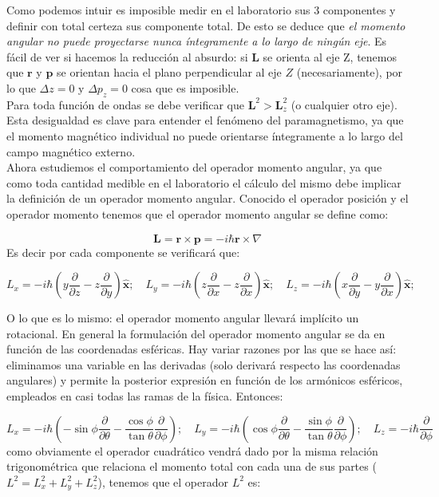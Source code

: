 \documentclass[12pt]{article}
\newcommand{\parentesis}[1]{\left( #1  \right)}
\newcommand{\parciales}[2]{\frac{\partial #1}{\partial #2}}
\newcommand{\rn}{\mathbf{r}}
\newcommand{\pn}{\mathbf{p}}
\newcommand{\Ln}{\mathbf{L}}
\newcommand{\xn}{\mathbf{\hat{x}}}
\begin{document}
Como podemos intuir es imposible medir en el laboratorio sus 3 componentes y definir con total certeza sus componente total. De esto se deduce que \textit{el momento angular no puede proyectarse nunca íntegramente a lo largo de ningún eje}. Es fácil de ver si hacemos la reducción al absurdo: si $\Ln$ se orienta al eje Z, tenemos que $\rn$ y $\pn$ se orientan hacia el plano perpendicular al eje $Z$ (necesariamente), por lo que $\Delta z = 0$ y $\Delta p_z = 0$ cosa que es imposible. \\

Para toda función de ondas se debe verificar que $\Ln^2 > \Ln_z^2$ (o cualquier otro eje). Esta desigualdad es clave para entender el fenómeno del paramagnetismo, ya que el momento magnético individual no puede orientarse íntegramente a lo largo del campo magnético externo. \\

Ahora estudiemos el comportamiento del operador momento angular, ya que como toda cantidad medible en el laboratorio el cálculo del mismo debe implicar la definición de un operador momento angular. Conocido el operador posición y el operador momento tenemos que el operador momento angular se define como:

$$\Ln = \rn \times \pn = - i \hbar \rn \times \nabla $$
Es decir por cada componente se verificará que:

\begin{equation} 
L_x = - i \hbar \parentesis{y \parciales{}{z}-z\parciales{}{y}} \xn; \quad L_y = - i \hbar \parentesis{z \parciales{}{x}-z\parciales{}{x}} \xn; \quad L_z = - i \hbar \parentesis{x \parciales{}{y}-y\parciales{}{x}} \xn; 
\end{equation}

O lo que es lo mismo: el operador momento angular llevará implícito un rotacional. En general la formulación del operador momento angular se da en función de las coordenadas esféricas. Hay variar razones por las que se hace así: eliminamos una variable en las derivadas (solo derivará respecto las coordenadas angulares) y permite la posterior expresión en función de los armónicos esféricos, empleados en casi todas las ramas de la física. Entonces:

\begin{equation}
L_x = - i \hbar \parentesis{- \sin \phi \parciales{}{\theta} - \dfrac{\cos \phi}{\tan \theta}\parciales{}{\phi}}; \quad L_y  = - i \hbar \parentesis{{\cos \phi} \parciales{}{\theta} - \dfrac{\sin \phi}{\tan \theta} \parciales{}{\phi}}; \quad L_z = - i \hbar \parciales{}{\phi} \label{Ec:funcionesangulares}
\end{equation}
como obviamente el operador cuadrático vendrá dado por la misma relación trigonométrica que relaciona el momento total con cada una de sus partes ($L^2 = L_x^2 + L_y^2 + L_z^2$), tenemos que el operador $L^2$ es:
\end{document}
